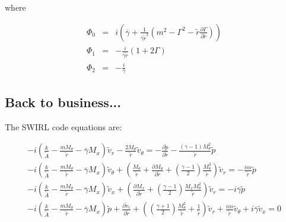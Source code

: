 \documentclass[12pt]{article}
\begin{document}
where

\begin{eqnarray}
\Phi_0 
&=&
i 
\left(
\overline{\gamma} 
+\frac{1 }{\overline{\gamma} \widetilde{r}^2}
\left(
m^2
- \Gamma^2
-\widetilde{r}
\frac{\partial \Gamma}{\partial \widetilde{r}}
\right)
\right)
\nonumber
\\
\Phi_1 
&=&
-\frac{i}{\overline{\gamma} \widetilde{r}}
\left(
1
+
2 \Gamma
\right)
\nonumber
\\
\Phi_2 
&=&
-\frac{i}{ \overline{\gamma}}
\nonumber
\end{eqnarray}

\subsection{Back to business...}

The SWIRL code equations are:

\begin{small}
\begin{eqnarray}
-i
\left(
 \frac{k}{ \widetilde{A}}
- \frac{ m M_{\theta} }{\widetilde{r}}
- \overline{\gamma} M_x  
\right) \widetilde{v}_r 
-\frac{2 M_{\theta}}{\widetilde{r}} \widetilde{v}_{\theta} 
 = 
-
\frac{\partial \widetilde{p} }{\partial \widetilde{r}} 
-
\frac{\left(\gamma - 1 \right) M_{\theta}^2}{\widetilde{r}} \widetilde{p}
\nonumber
\\
-i
\left(
\frac{k}{\widetilde{A}}
- \frac{ m M_{\theta} }{\widetilde{r} }
- \overline{\gamma} M_x  
\right) \widetilde{v}_{\theta} 
+
\left(
\frac{M_{\theta} }{\widetilde{r}}
+
\frac{\partial M_{\theta} }{\partial \widetilde{r}}
+
\left(\frac{\gamma - 1}{2} \right) \frac{M_{\theta}^3}{\widetilde{r}}
\right) 
\widetilde{v}_r
 = 
-\frac{i m }{\widetilde{r} } \widetilde{p}
\nonumber
\\
-i
\left(
\frac{k}{\widetilde{A}}
- \frac{ m M_{\theta} }{\widetilde{r} }
- \overline{\gamma} M_x
\right) \widetilde{v}_x 
+
\left(
\frac{\partial M_x }{\partial \widetilde{r}} 
+
\left(\frac{\gamma - 1}{2} \right) \frac{M_x M_{\theta}^2}{\widetilde{r}}
\right)
\widetilde{v}_r
 = 
-i \overline{\gamma} \widetilde{p}
\nonumber
\\
-i
\left(
\frac{k}{\widetilde{A}}
- \frac{ m M_{\theta}}{\widetilde{r} } 
-  \overline{\gamma} M_x
\right) \widetilde{p}
+ 
\frac{\partial \widetilde{v}_r }{\partial \widetilde{r}}
+ 
\left(
\left(\frac{\gamma + 1}{2} \right) \frac{M_{\theta}^2}{\widetilde{r}}
+\frac{1 }{\widetilde{r}} 
\right)
\widetilde{v}_r
+\frac{i m }{\widetilde{r}} \widetilde{v}_{\theta} 
+ i \overline{\gamma} \widetilde{v}_x 
 = 
0
\nonumber
\end{eqnarray}
\end{small}%
\end{document}
